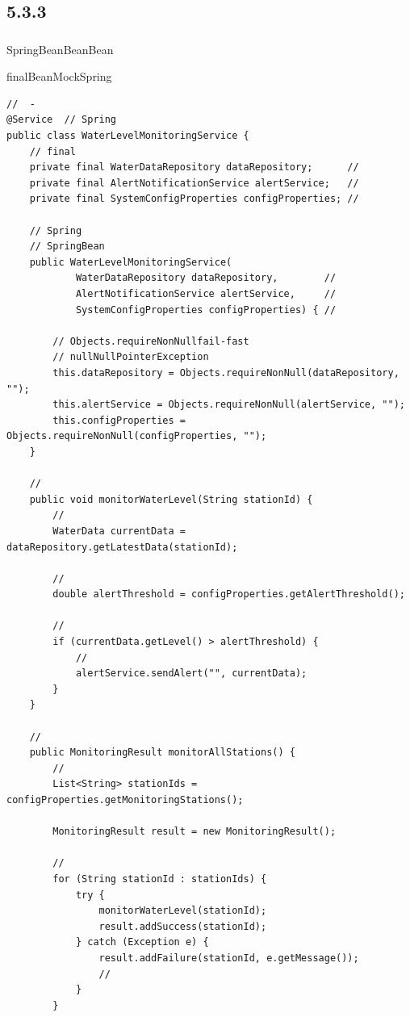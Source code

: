 \hypertarget{section-50}{%
\subsection{5.3.3}\label{section-50}}

\hypertarget{section-51}{%
\subsubsection{}\label{section-51}}

Spring\important{}BeanBeanBean

\important{}finalBean\important{}MockSpring

\begin{lstlisting}[style=java]
//  - 
@Service  // Spring
public class WaterLevelMonitoringService {
    // final
    private final WaterDataRepository dataRepository;      // 
    private final AlertNotificationService alertService;   // 
    private final SystemConfigProperties configProperties; // 
    
    // Spring
    // SpringBean
    public WaterLevelMonitoringService(
            WaterDataRepository dataRepository,        // 
            AlertNotificationService alertService,     // 
            SystemConfigProperties configProperties) { // 
        
        // Objects.requireNonNullfail-fast
        // nullNullPointerException
        this.dataRepository = Objects.requireNonNull(dataRepository, "");
        this.alertService = Objects.requireNonNull(alertService, "");  
        this.configProperties = Objects.requireNonNull(configProperties, "");
    }
    
    // 
    public void monitorWaterLevel(String stationId) {
        // 
        WaterData currentData = dataRepository.getLatestData(stationId);
        
        // 
        double alertThreshold = configProperties.getAlertThreshold();
        
        // 
        if (currentData.getLevel() > alertThreshold) {
            // 
            alertService.sendAlert("", currentData);
        }
    }
    
    // 
    public MonitoringResult monitorAllStations() {
        // 
        List<String> stationIds = configProperties.getMonitoringStations();
        
        MonitoringResult result = new MonitoringResult();
        
        // 
        for (String stationId : stationIds) {
            try {
                monitorWaterLevel(stationId);
                result.addSuccess(stationId);
            } catch (Exception e) {
                result.addFailure(stationId, e.getMessage());
                // 
            }
        }
        

\end{lstlisting}
